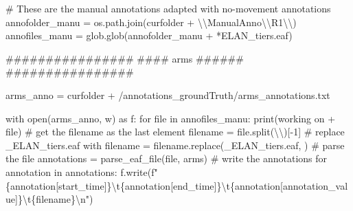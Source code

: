 \documentclass[
  letterpaper,
  DIV=11,
  numbers=noendperiod]{scrreprt}
\newenvironment{Shaded}{\begin{snugshade}}{\end{snugshade}}
\newcommand{\BuiltInTok}[1]{\textcolor[rgb]{0.00,0.23,0.31}{#1}}
\newcommand{\CharTok}[1]{\textcolor[rgb]{0.13,0.47,0.30}{#1}}
\newcommand{\CommentTok}[1]{\textcolor[rgb]{0.37,0.37,0.37}{#1}}
\newcommand{\ControlFlowTok}[1]{\textcolor[rgb]{0.00,0.23,0.31}{#1}}
\newcommand{\DecValTok}[1]{\textcolor[rgb]{0.68,0.00,0.00}{#1}}
\newcommand{\ImportTok}[1]{\textcolor[rgb]{0.00,0.46,0.62}{#1}}
\newcommand{\KeywordTok}[1]{\textcolor[rgb]{0.00,0.23,0.31}{#1}}
\newcommand{\NormalTok}[1]{\textcolor[rgb]{0.00,0.23,0.31}{#1}}
\newcommand{\OperatorTok}[1]{\textcolor[rgb]{0.37,0.37,0.37}{#1}}
\newcommand{\SpecialCharTok}[1]{\textcolor[rgb]{0.37,0.37,0.37}{#1}}
\newcommand{\SpecialStringTok}[1]{\textcolor[rgb]{0.13,0.47,0.30}{#1}}
\newcommand{\StringTok}[1]{\textcolor[rgb]{0.13,0.47,0.30}{#1}}
\begin{document}
\begin{Shaded}
\begin{Highlighting}[]
\CommentTok{\# These are the manual annotations adapted with no{-}movement annotations}
\NormalTok{annofolder\_manu }\OperatorTok{=}\NormalTok{ os.path.join(curfolder }\OperatorTok{+} \StringTok{\textquotesingle{}}\CharTok{\textbackslash{}\textbackslash{}}\StringTok{ManualAnno}\CharTok{\textbackslash{}\textbackslash{}}\StringTok{R1}\CharTok{\textbackslash{}\textbackslash{}}\StringTok{\textquotesingle{}}\NormalTok{)}
\NormalTok{annofiles\_manu }\OperatorTok{=}\NormalTok{ glob.glob(annofolder\_manu }\OperatorTok{+} \StringTok{\textquotesingle{}*ELAN\_tiers.eaf\textquotesingle{}}\NormalTok{)}

\CommentTok{\#\#\#\#\#\#\#\#\#\#\#\#\#\#\#\#}
\CommentTok{\#\#\#\# arms \#\#\#\#\#\#}
\CommentTok{\#\#\#\#\#\#\#\#\#\#\#\#\#\#\#\#}

\NormalTok{arms\_anno }\OperatorTok{=}\NormalTok{ curfolder }\OperatorTok{+} \StringTok{\textquotesingle{}/annotations\_groundTruth/arms\_annotations.txt\textquotesingle{}}

\ControlFlowTok{with} \BuiltInTok{open}\NormalTok{(arms\_anno, }\StringTok{\textquotesingle{}w\textquotesingle{}}\NormalTok{) }\ImportTok{as}\NormalTok{ f:}
    \ControlFlowTok{for} \BuiltInTok{file} \KeywordTok{in}\NormalTok{ annofiles\_manu:}
        \BuiltInTok{print}\NormalTok{(}\StringTok{\textquotesingle{}working on \textquotesingle{}} \OperatorTok{+} \BuiltInTok{file}\NormalTok{)}
        \CommentTok{\# get the filename as the last element}
\NormalTok{        filename }\OperatorTok{=} \BuiltInTok{file}\NormalTok{.split(}\StringTok{\textquotesingle{}}\CharTok{\textbackslash{}\textbackslash{}}\StringTok{\textquotesingle{}}\NormalTok{)[}\OperatorTok{{-}}\DecValTok{1}\NormalTok{]}
        \CommentTok{\# replace \_ELAN\_tiers.eaf with \textquotesingle{}\textquotesingle{}}
\NormalTok{        filename }\OperatorTok{=}\NormalTok{ filename.replace(}\StringTok{\textquotesingle{}\_ELAN\_tiers.eaf\textquotesingle{}}\NormalTok{, }\StringTok{\textquotesingle{}\textquotesingle{}}\NormalTok{)}
        \CommentTok{\# parse the file}
\NormalTok{        annotations }\OperatorTok{=}\NormalTok{ parse\_eaf\_file(}\BuiltInTok{file}\NormalTok{, }\StringTok{\textquotesingle{}arms\textquotesingle{}}\NormalTok{)}
        \CommentTok{\# write the annotations}
        \ControlFlowTok{for}\NormalTok{ annotation }\KeywordTok{in}\NormalTok{ annotations:}
\NormalTok{            f.write(}\SpecialStringTok{f"}\SpecialCharTok{\{}\NormalTok{annotation[}\StringTok{\textquotesingle{}start\_time\textquotesingle{}}\NormalTok{]}\SpecialCharTok{\}}\CharTok{\textbackslash{}t}\SpecialCharTok{\{}\NormalTok{annotation[}\StringTok{\textquotesingle{}end\_time\textquotesingle{}}\NormalTok{]}\SpecialCharTok{\}}\CharTok{\textbackslash{}t}\SpecialCharTok{\{}\NormalTok{annotation[}\StringTok{\textquotesingle{}annotation\_value\textquotesingle{}}\NormalTok{]}\SpecialCharTok{\}}\CharTok{\textbackslash{}t}\SpecialCharTok{\{}\NormalTok{filename}\SpecialCharTok{\}}\CharTok{\textbackslash{}n}\SpecialStringTok{"}\NormalTok{)}


\end{Highlighting}
\end{Shaded}
\end{document}
